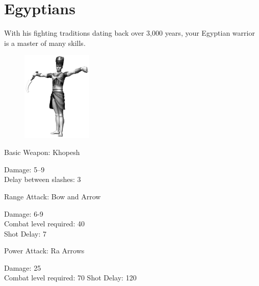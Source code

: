 \clearpage

\section{Egyptians}

With his fighting traditions dating back over 3,000 years, your Egyptian warrior is a master of many skills.

\begin{figure}
	\begin{center}
		\vspace{-20pt}
		\includegraphics[width=0.3\textwidth]{Aegyptian}
	\end{center}
	\vspace{-20pt}
\end{figure}

Basic Weapon: Khopesh
\begin{adjustwidth}{1cm}{}
	Damage: 5–9 \\
	Delay between slashes: 3
	\end{adjustwidth}
Range Attack: Bow and Arrow
\begin{adjustwidth}{1cm}{}
	Damage: 6-9 \\
	Combat level required: 40 \\
	Shot Delay: 7
\end{adjustwidth}
Power Attack: Ra Arrows
\begin{adjustwidth}{1cm}{}
	Damage: 25 \\
	Combat level required: 70
	Shot Delay: 120 
\end{adjustwidth}

